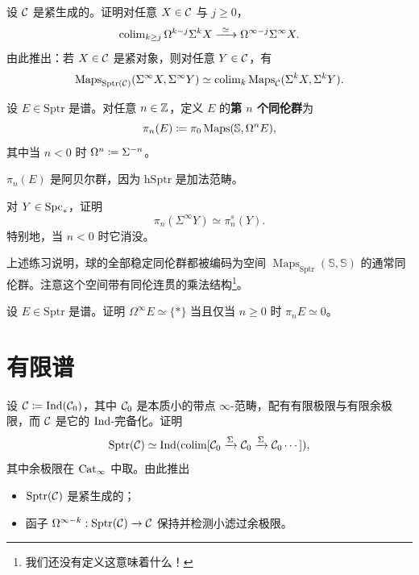 \begin{exercise}\label{L14-4.6}
设 $\mathcal{C}$ 是紧生成的。证明对任意 $X\in\mathcal{C}$ 与 $j\ge 0$，
\[
\colim_{k\ge j}\Omega^{k-j}\Sigma^{k}X\xrightarrow{\ \simeq\ }\Omega^{\infty-j}\Sigma^{\infty}X.
\]
由此推出：若 $X\in\mathcal{C}$ 是紧对象，则对任意 $Y\in\mathcal{C}$，有
\[
\operatorname{Maps}_{\mathrm{Sptr}(\mathcal{C})}(\Sigma^{\infty}X,\Sigma^{\infty}Y)\simeq\operatorname{colim}_{k}\operatorname{Maps}_{\mathcal{C}}(\Sigma^{k}X,\Sigma^{k}Y).
\]
\end{exercise}

\begin{definition}\label{L14-4.7}
设 $E\in\mathrm{Sptr}$ 是谱。对任意 $n\in\mathbb{Z}$，定义 $E$ 的\textbf{第 $n$ 个同伦群}为
\[
\pi_{n}(E)\coloneqq\pi_{0}\operatorname{Maps}(\mathbb{S},\Omega^{n}E),
\]
其中当 $n<0$ 时 $\Omega^{n}\coloneqq\Sigma^{-n}$。
\end{definition}

\begin{remark}\label{L14-4.8}
$\pi_{n}(E)$ 是阿贝尔群，因为 $\mathrm{h}\mathrm{Sptr}$ 是加法范畴。
\end{remark}

\begin{exercise}\label{L14-4.9}
对 $Y\in\operatorname{Spc}_{\ast}$，证明
\[
\pi_{n}(\Sigma^{\infty}Y)\simeq\pi^{s}_{n}(Y).
\]
特别地，当 $n<0$ 时它消没。
\end{exercise}

\begin{remark}\label{L14-4.10}
上述练习说明，球的全部稳定同伦群都被编码为空间 $\operatorname{Maps}_{\mathrm{Sptr}}(\mathbb{S},\mathbb{S})$ 的通常同伦群。注意这个空间带有同伦连贯的乘法结构\footnote{我们还没有定义这意味着什么！}。
\end{remark}

\begin{exercise}\label{L14-4.11}
设 $E\in\mathrm{Sptr}$ 是谱。证明 $\Omega^{\infty}E\simeq\{\ast\}$ 当且仅当 $n\ge 0$ 时 $\pi_{n}E\simeq 0$。
\end{exercise}

\section{有限谱}

\begin{exercise}\label{L14-5.1}
设 $\mathcal{C}\coloneqq\operatorname{Ind}(\mathcal{C}_{0})$，其中 $\mathcal{C}_{0}$ 是本质小的带点 $\infty$-范畴，配有有限极限与有限余极限，而 $\mathcal{C}$ 是它的 $\operatorname{Ind}$-完备化。证明
\[
\mathrm{Sptr}(\mathcal{C})\simeq\operatorname{Ind}(\operatorname{colim}[\mathcal{C}_{0}\xrightarrow{\Sigma}\mathcal{C}_{0}\xrightarrow{\Sigma}\mathcal{C}_{0}\cdots]),
\]
其中余极限在 $\operatorname{Cat}_{\infty}$ 中取。由此推出
\begin{itemize}[leftmargin=2.2em,itemsep=0.1em]
\item $\mathrm{Sptr}(\mathcal{C})$ 是紧生成的；
\item 函子 $\Omega^{\infty-k}:\mathrm{Sptr}(\mathcal{C})\to\mathcal{C}$ 保持并检测小滤过余极限。
\end{itemize}
\end{exercise}

